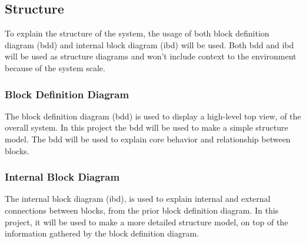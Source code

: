 \subsection{Structure}\label{sc:structure}
To explain the structure of the system, the usage of both block definition diagram (bdd) and internal block diagram (ibd) will be used. Both bdd and ibd will be used as structure diagrams and won't include context to the environment because of the system scale.

\subsubsection{Block Definition Diagram}\label{ssc:blockdefinitiondiagram}
The block definition diagram (bdd) is used to display a high-level top view, of the overall system. In this project the bdd will be used to make a simple structure model. The bdd will be used to explain core behavior and relationship between blocks.

\subsubsection{Internal Block Diagram}\label{ssc:internalblockdiagram}
The internal block diagram (ibd), is used to explain internal and external connections between blocks, from the prior block definition diagram. In this project, it will be used to make a more detailed structure model, on top of the information gathered by the block definition diagram.